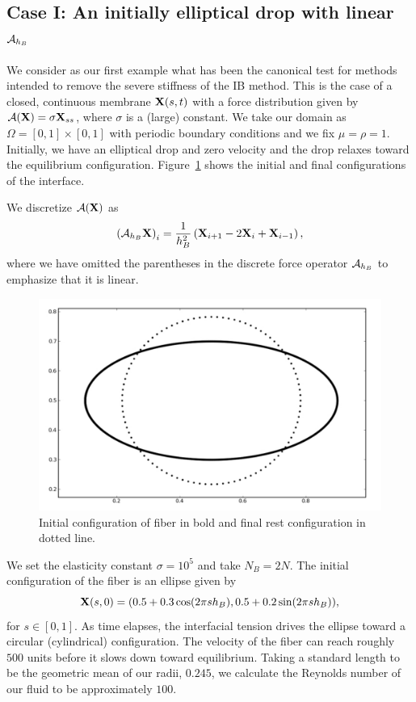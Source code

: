 \subsection{Case I: An initially elliptical drop with linear $\mathcal{A}_{h_B}$}
\label{Sec:drop}
We consider as our first example what has been the canonical test for methods intended to remove the severe stiffness of the IB method. This is the case of a closed, continuous membrane $\mathbf{X}(s,t)$ with a force distribution given by $\mathcal{A}(\mathbf{X})=\sigma\mathbf{X}_{ss}$, where $\sigma$ is a (large) constant. We take our domain as $\Omega = [0,1]\times[0,1]$ with periodic boundary conditions and we fix $\mu=\rho=1$. Initially, we have an elliptical drop and zero velocity and the drop relaxes toward the equilibrium configuration. Figure~\ref{fig:Ellipse} shows the initial and final configurations of the interface.

We discretize $\mathcal{A}(\mathbf{X})$ as
\begin{equation}
\left(\mathcal{A}_{h_B}\mathbf{X}\right)_i = \frac{1}{h_B^2}\left(\mathbf{X}_{i+1}-2\mathbf{X}_i+\mathbf{X}_{i-1}\right),
\label{eqn:LinearForce}
\end{equation}
where we have omitted the parentheses in the discrete force operator $\mathcal{A}_{h_B}$ to emphasize that it is linear.
\begin{figure}[!b]
  \begin{center}
    \includegraphics[bb=0in 0in 7.7in 4.8in,width=4.8in,clip]{Images_Methodology/Ellipse.pdf}
  \end{center}
  \caption{\small Initial configuration of fiber in bold and final rest configuration in dotted line.}
  \label{fig:Ellipse}
\end{figure}

We set the elasticity constant $\sigma=10^5$ and take $N_B = 2N$. The initial configuration of the fiber is an ellipse given by
\begin{equation}
\mathbf{X}(s,0) = (0.5 + 0.3\cos(2\pi sh_B), 0.5 + 0.2\sin(2\pi sh_B)),
\end{equation}
for $s \in [0,1]$.
As time elapses,  the interfacial tension drives the ellipse toward a circular (cylindrical) configuration. The velocity of the fiber can reach roughly $500$ units before it slows down toward equilibrium. Taking a standard length to be the geometric mean of our radii, $0.245$, we calculate the Reynolds number of our fluid to be approximately $100$.


